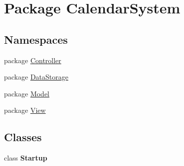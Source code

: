 \hypertarget{namespace_calendar_system}{\section{Package Calendar\+System}
\label{namespace_calendar_system}
}
\subsection*{Namespaces}
\begin{DoxyCompactItemize}
\item 
package \hyperlink{namespace_calendar_system_1_1_controller}{Controller}
\item 
package \hyperlink{namespace_calendar_system_1_1_data_storage}{Data\+Storage}
\item 
package \hyperlink{namespace_calendar_system_1_1_model}{Model}
\item 
package \hyperlink{namespace_calendar_system_1_1_view}{View}
\end{DoxyCompactItemize}
\subsection*{Classes}
\begin{DoxyCompactItemize}
\item 
class {\bfseries Startup}
\end{DoxyCompactItemize}
